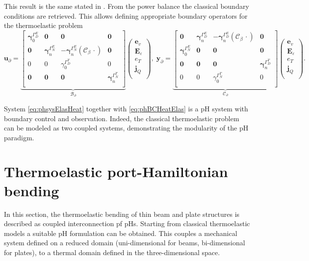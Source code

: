 This result is the same stated in \cite[page 332]{carlson1973}. From the power balance the classical boundary conditions are retrieved. This allows defining appropriate boundary operators for the thermoelastic problem
\begin{equation}\label{eq:phBCHeatElas}
	\bm{u}_\partial = 
	\underbrace{\begin{bmatrix}
	\bm{\gamma}_{0}^{\Gamma_D^E} & \bm{0} & \bm{0} & \bm{0} \\
	\bm{0} & \bm{\gamma}_n^{\Gamma_N^E} & - \bm{\gamma}_n^{\Gamma_N^E}(\bm{\mathcal{C}}_\beta\, \cdot )  & \bm{0}  \\ 
	{0} & {0} & {\gamma}_{0}^{\Gamma_D^T} & {0} \\
	\bm{0} & \bm{0} & \bm{0} & \bm{\gamma}_{n}^{\Gamma_N^T} \\
	\end{bmatrix}}_{\mathcal{B}_\partial}
	\begin{pmatrix}
	\bm{e}_v \\
	\bm{E}_\varepsilon \\
	{e}_T \\
	\bm{j}_Q \\
	\end{pmatrix}, \; 
	\bm{y}_\partial = 
	\underbrace{\begin{bmatrix}
		\bm{0} & \bm{\gamma}_n^{\Gamma_D^E} & - \bm{\gamma}_n^{\Gamma_D^E}(\bm{\mathcal{C}}_\beta\, \cdot )  & \bm{0}  \\ 
		\bm{\gamma}_{0}^{\Gamma_N^E} & \bm{0} & \bm{0} & \bm{0} \\
		\bm{0} & \bm{0} & \bm{0} & \bm{\gamma}_{n}^{\Gamma_D^T} \\
		{0} & {0} & {\gamma}_{0}^{\Gamma_N^T} & {0} \\
		\end{bmatrix}}_{\mathcal{C}_\partial}
	\begin{pmatrix}
	\bm{e}_v \\
	\bm{E}_\varepsilon \\
	{e}_T \\
	\bm{j}_Q \\
	\end{pmatrix}.
\end{equation} 

System \eqref{eq:phsysElasHeat} together with \eqref{eq:phBCHeatElas} is a pH system with boundary control and observation. Indeed, the classical thermoelastic problem can be modeled as two coupled systems, demonstrating the modularity of the pH paradigm.


\section{Thermoelastic port-Hamiltonian bending}
In this section, the thermoelastic bending of thin beam and plate structures is described as coupled interconnection pf pHs. Starting from classical thermoelastic models a suitable pH formulation can be obtained. This couples a mechanical system defined on a reduced domain (uni-dimensional for beams, bi-dimensional for plates), to a thermal domain defined in the three-dimensional space.


